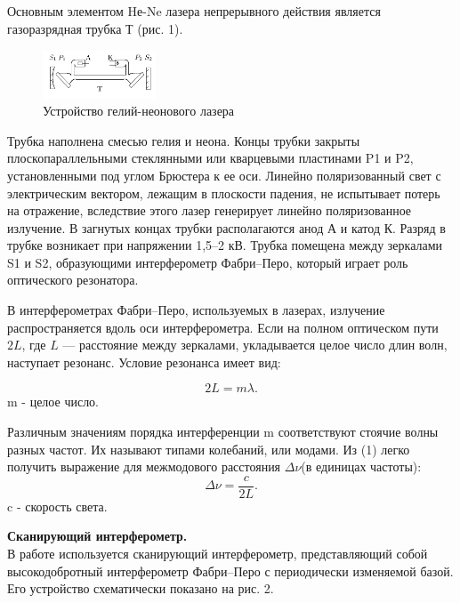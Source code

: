 \documentclass[a4paper, 12pt]{article}%
\begin{document}
	Основным элементом Hе-Ne лазера непрерывного действия
	является газоразрядная трубка
	Т (рис. 1).
	
	\begin{figure}[H]
		\begin{center}
				\includegraphics[width=0.3\textwidth]{Лазер.png}
			\caption{Устройство гелий-неонового лазера}
		\end{center}
	\end{figure}

	Трубка наполнена смесью гелия и неона. Концы трубки закрыты плоскопараллельными стеклянными или кварцевыми пластинами P1 и P2, установленными под углом
	Брюстера к ее оси. Линейно поляризованный свет с электрическим
	вектором, лежащим в плоскости падения, не испытывает потерь на
	отражение, вследствие этого лазер генерирует линейно поляризованное излучение. В загнутых концах трубки располагаются анод А и
	катод К. Разряд в трубке возникает при напряжении 1,5–2 кВ. Трубка помещена между зеркалами S1 и S2, образующими интерферометр
	Фабри–Перо, который играет роль оптического резонатора.
	
	
	В интерферометрах Фабри–Перо, используемых в лазерах, излучение распространяется вдоль оси интерферометра. Если на полном оптическом пути $2L$, где $L$ — расстояние между зеркалами, укладывается целое число длин волн, наступает резонанс. Условие резонанса имеет вид:
	
	
	\begin{equation}
		2L = m \lambda.
	\end{equation}
m - целое число.

Различным значениям порядка интерференции m соответствуют стоячие волны разных частот. Их называют типами колебаний, или модами. Из (1) легко получить выражение для межмодового расстояния $\Delta \nu$(в единицах частоты):
\begin{equation}
	\Delta \nu = \frac{c}{2L}.
\end{equation}
	c - скорость света.
	
	
	\noindent \textbf{Сканирующий интерферометр.}\\
	
	В работе используется сканирующий интерферометр, представляющий собой высокодобротный интерферометр Фабри–Перо с периодически изменяемой базой. Его	устройство схематически показано на рис. 2.
	
\end{document}
